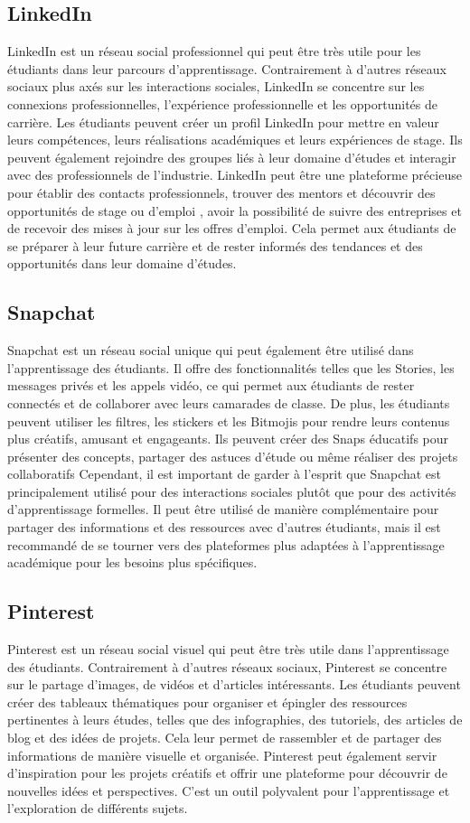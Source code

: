 \documentclass[12pt,a4paper,titlepage]{article}
\begin{document}
\subsection{LinkedIn}
LinkedIn est un réseau social professionnel qui peut être très utile pour les étudiants dans leur parcours d'apprentissage. Contrairement à d'autres réseaux sociaux plus axés sur les interactions sociales, LinkedIn se concentre sur les connexions professionnelles, l'expérience professionnelle et les opportunités de carrière. Les étudiants peuvent créer un profil LinkedIn pour mettre en valeur leurs compétences, leurs réalisations académiques et leurs expériences de stage. Ils peuvent également rejoindre des groupes liés à leur domaine d'études et interagir avec des professionnels de l'industrie. LinkedIn peut être une plateforme précieuse pour établir des contacts professionnels, trouver des mentors et découvrir des opportunités de stage ou d'emploi , avoir la possibilité de suivre des entreprises et de recevoir des mises à jour sur les offres d'emploi. Cela permet aux étudiants de se préparer à leur future carrière et de rester informés des tendances et des opportunités dans leur domaine d'études.
\subsection{Snapchat}
Snapchat est un réseau social unique qui peut également être utilisé dans l'apprentissage des étudiants. Il offre des fonctionnalités telles que les Stories, les messages privés et les appels vidéo, ce qui permet aux étudiants de rester connectés et de collaborer avec leurs camarades de classe. De plus, les étudiants peuvent utiliser les filtres, les stickers et les Bitmojis pour rendre leurs contenus plus créatifs, amusant et engageants. Ils peuvent créer des Snaps éducatifs pour présenter des concepts, partager des astuces d'étude ou même réaliser des projets collaboratifs Cependant, il est important de garder à l'esprit que Snapchat est principalement utilisé pour des interactions sociales plutôt que pour des activités d'apprentissage formelles. Il peut être utilisé de manière complémentaire pour partager des informations et des ressources avec d'autres étudiants, mais il est recommandé de se tourner vers des plateformes plus adaptées à l'apprentissage académique pour les besoins plus spécifiques. 
\subsection{Pinterest}
Pinterest est un réseau social visuel qui peut être très utile dans l'apprentissage des étudiants. Contrairement à d'autres réseaux sociaux, Pinterest se concentre sur le partage d'images, de vidéos et d'articles intéressants. Les étudiants peuvent créer des tableaux thématiques pour organiser et épingler des ressources pertinentes à leurs études, telles que des infographies, des tutoriels, des articles de blog et des idées de projets. Cela leur permet de rassembler et de partager des informations de manière visuelle et organisée. Pinterest peut également servir d'inspiration pour les projets créatifs et offrir une plateforme pour découvrir de nouvelles idées et perspectives. C'est un outil polyvalent pour l'apprentissage et l'exploration de différents sujets.
\end{document}
